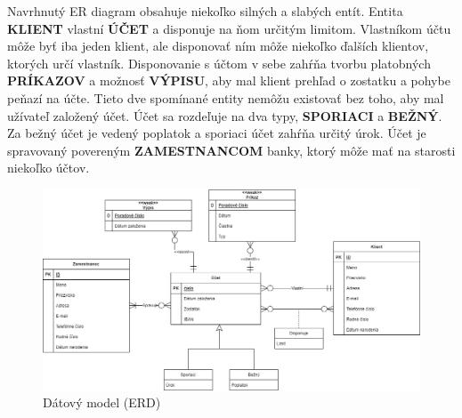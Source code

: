 \documentclass[a4paper, 11pt, report]{article}
\begin{document}
    Navrhnutý ER diagram obsahuje niekoľko silných a slabých entít. Entita \textbf{KLIENT} vlastní \textbf{ÚČET} a disponuje na ňom určitým limitom. Vlastníkom účtu môže byť iba jeden klient, ale disponovať ním môže niekoľko ďalších klientov, ktorých určí vlastník. Disponovanie s účtom v sebe zahŕňa tvorbu platobných \textbf{PRÍKAZOV} a možnosť \textbf{VÝPISU}, aby mal klient prehľad o zostatku a pohybe peňazí na účte. Tieto dve spomínané entity nemôžu existovať bez toho, aby mal užívateľ založený účet. Účet sa rozdeľuje na dva typy, \textbf{SPORIACI} a \textbf{BEŽNÝ}. Za bežný účet je vedený poplatok a sporiaci účet zahŕňa určitý úrok. Účet je spravovaný povereným \textbf{ZAMESTNANCOM} banky, ktorý môže mať na starosti niekoľko účtov.
    
    \bigskip
		\begin{figure}[h]
			\centering
			\includegraphics[width=0.95 \linewidth]{ERDiagram.png}
			\caption{Dátový model (ERD)}
		\end{figure}
\end{document}
